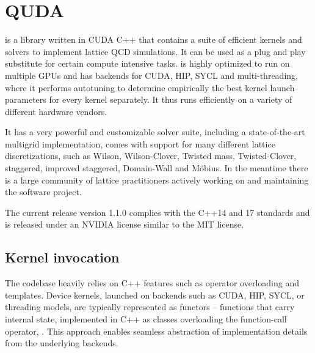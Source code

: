 \chapter{QUDA}
\label{ch:p1:quda}




\Quda \cite{QUDApaper} is a library written in CUDA C++ that contains a suite of efficient kernels and solvers to implement lattice QCD simulations. It can be used as a plug and play substitute for certain compute intensive tasks.
\Quda is highly optimized to run on multiple GPUs and has backends for CUDA, HIP, SYCL and multi-threading, where it performs autotuning to determine empirically the best kernel launch parameters for every kernel separately.
It thus runs efficiently on a variety of different hardware vendors.

It has a very powerful and customizable solver suite, including a state-of-the-art multigrid implementation, comes with support for many different lattice discretizations, such as Wilson, Wilson-Clover, Twisted mass, Twisted-Clover, staggered, improved staggered, Domain-Wall and Möbius. In the meantime there is a large community of lattice practitioners actively working on and maintaining the software project.

The current release version 1.1.0 complies with the C++14 and 17 standards and is released under an NVIDIA license similar to the MIT license.

\section{Kernel invocation}

The codebase heavily relies on C++ features such as operator overloading and templates. Device kernels, launched on backends such as CUDA, HIP, SYCL, or threading models, are typically represented as functors -- functions that carry internal state, implemented in C++ as classes overloading the function-call operator, . This approach enables seamless abstraction of implementation details from the underlying backends.

